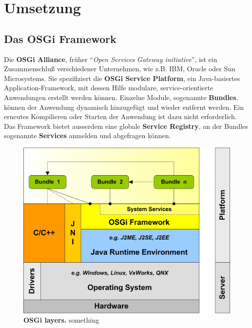 \chapter{Umsetzung}
\section{Das OSGi Framework}
Die \textbf{OSGi Alliance}, früher
\enquote{\textit{Open Services Gateway initiative}}, ist ein Zusammenschluß
verschiedener Unternehmen, wie z.B. IBM, Oracle oder Sun Microsystems.
Sie spezifiziert die \textbf{OSGi Service Platform}, ein Java-basiertes
Application-Framework, mit dessen Hilfe modulare, service-orientierte
Anwendungen erstellt werden können. Einzelne Module, sogenannte
\textbf{Bundles}, können der Anwendung dynamisch hinzugefügt und wieder
entfernt werden. Ein erneutes Kompilieren oder Starten der Anwendung ist dazu
nicht erforderlich.
Das Framework bietet ausserdem eine globale \textbf{Service Registry}, an der
Bundles sogenannte \textbf{Services} anmelden und abgefragen können.
\citep{wtherich_die_2008}

\begin{figure}[p]
	\begin{center}
		\includegraphics[scale=2]{pics/osgi_layer.png}
	\caption[OSGi layers]{
	\textbf{OSGi layers.}
	something}
	\end{center}
	\label{fig:osgi_layer}
\end{figure}

